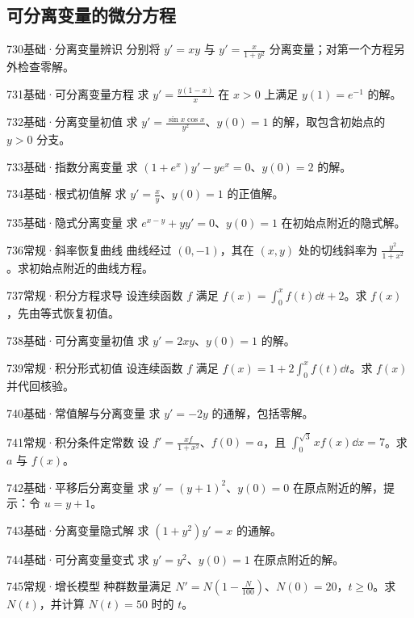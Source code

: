 \subsection{可分离变量的微分方程}
\begin{exercise}{730}{基础·分离变量辨识}
分别将 $y'=xy$ 与 $y'=\frac{x}{1+y^2}$ 分离变量；对第一个方程另外检查零解。
\end{exercise}
\begin{exercise}{731}{基础·可分离变量方程}
求 $y'=\frac{y(1-x)}{x}$ 在 $x>0$ 上满足 $y(1)=e^{-1}$ 的解。
\end{exercise}
\begin{exercise}{732}{基础·分离变量初值}
求 $y'=\frac{\sin x\cos x}{y^2}$、$y(0)=1$ 的解，取包含初始点的 $y>0$ 分支。
\end{exercise}
\begin{exercise}{733}{基础·指数分离变量}
求 $(1+e^x)y'-ye^x=0$、$y(0)=2$ 的解。
\end{exercise}
\begin{exercise}{734}{基础·根式初值解}
求 $y'=\frac{x}{y}$、$y(0)=1$ 的正值解。
\end{exercise}
\begin{exercise}{735}{基础·隐式分离变量}
求 $e^{x-y}+yy'=0$、$y(0)=1$ 在初始点附近的隐式解。
\end{exercise}
\begin{exercise}{736}{常规·斜率恢复曲线}
曲线经过 $(0,-1)$，其在 $(x,y)$ 处的切线斜率为 $\frac{y^2}{1+x^2}$。求初始点附近的曲线方程。
\end{exercise}
\begin{exercise}{737}{常规·积分方程求导}
设连续函数 $f$ 满足 $f(x)=\int_0^xf(t)\dd t+2$。求 $f(x)$，先由等式恢复初值。
\end{exercise}
\begin{exercise}{738}{基础·可分离变量初值}
求 $y'=2xy$、$y(0)=1$ 的解。
\end{exercise}
\begin{exercise}{739}{常规·积分形式初值}
设连续函数 $f$ 满足 $f(x)=1+2\int_0^xf(t)\dd t$。求 $f(x)$ 并代回核验。
\end{exercise}
\begin{exercise}{740}{基础·常值解与分离变量}
求 $y'=-2y$ 的通解，包括零解。
\end{exercise}
\begin{exercise}{741}{常规·积分条件定常数}
设 $f'=\frac{xf}{1+x^2}$、$f(0)=a$，且 $\int_0^{\sqrt3}xf(x)\dd x=7$。求 $a$ 与 $f(x)$。
\end{exercise}
\begin{exercise}{742}{基础·平移后分离变量}
求 $y'=(y+1)^2$、$y(0)=0$ 在原点附近的解，提示：令 $u=y+1$。
\end{exercise}
\begin{exercise}{743}{基础·分离变量隐式解}
求 $(1+y^2)y'=x$ 的通解。
\end{exercise}
\begin{exercise}{744}{基础·可分离变量变式}
求 $y'=y^2$、$y(0)=1$ 在原点附近的解。
\end{exercise}
\begin{exercise}{745}{常规·增长模型}
种群数量满足 $N'=N(1-\frac{N}{100})$、$N(0)=20$，$t\ge0$。求 $N(t)$，并计算 $N(t)=50$ 时的 $t$。
\end{exercise}
